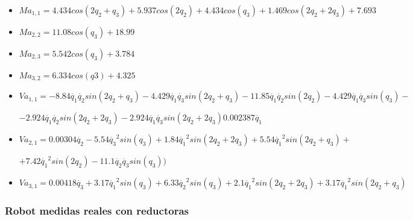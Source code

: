 \begin{itemize}
	
	\item $ Ma_{1,1}=4.434cos(2q_{2} + q_{3}) + 5.937cos(2q_{2}) + 4.434cos(q_{3}) + 1.469cos(2q_{2} + 2q_{3}) + 7.693$ \\ \vspace{0.2cm}
	
	\item $ Ma_{2,2}=11.08cos(q_{3}) + 18.99$ \\ \vspace{0.2cm}
	
	\item $ Ma_{2,3}=5.542cos(q_{3}) + 3.784$ \\ \vspace{0.2cm}
	
	\item $ Ma_{3,2}=6.334cos(q3) + 4.325$ \\ \vspace{0.2cm}
	
	\item $ Va_{1,1}=-8.84\dot{q_1}\dot{q_2}sin(2q_2 + q_3) - 4.429\dot{q_1}\dot{q_3}sin(2q_2 + q_3)  -11.85\dot{q_1}\dot{q_2}sin(2q_2) - 4.429\dot{q_1}\dot{q_3}sin(q_3)-$ \\ \vspace{0.1cm}
	
	$-2.924\dot{q_1}\dot{q_2}sin(2q_2 + 2q_3) - 2.924\dot{q_1}\dot{q_3}sin(2q_2 + 2q_3) 0.002387\dot{q_1} $ \\ \vspace{0.2cm}
	
	\item $ Va_{2,1}=0.00304\dot{q_2} - 5.54\dot{q_3}^{2}sin(q_{3}) + 1.84\dot{q_{1}}^{2}sin(2q_{2} + 2q_{3}) + 5.54\dot{q_1}^{2}sin(2q_{2} + q_{3}) + $ \\ \vspace{0.1cm}
	
	$ + 7.42\dot{q_1}^{2}sin(2q_{2}) - 11.1\dot{q_{2}}\dot{q_{3}}sin(q_{3}) ) $\\ \vspace{0.2cm}
	
	\item $ Va_{3,1}=0.00418\dot{q_3} + 3.17\dot{q_1}^{2}sin(q_{3}) + 6.33\dot{q_2}^{2}sin(q_{3}) + 2.1\dot{q_1}^{2}sin(2q_{2} + 2q_{3}) + 3.17\dot{q_1}^{2}sin(2q_{2} + q_{3}) $
	
\end{itemize}

\subsubsection{Robot medidas reales con reductoras}

